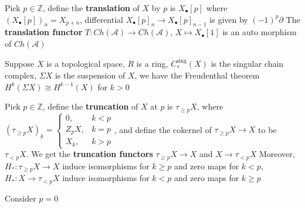 \documentclass[../main.tex]{subfiles}
\begin{document}
\begin{definition}
Pick $p\in\mathbb Z$, define the \textbf{translation} of $X$ by $p$ is $X_\bullet[p]$ where $(X_\bullet[p])_n=X_{p+n}$, differential $X_\bullet[p]_n\to X_\bullet[p]_{n-1}$ is given by $(-1)^p\partial$
The \textbf{translation functor} $T:Ch(\mathscr A)\to Ch(\mathscr A)$, $X\mapsto X_\bullet[1]$ is an auto morphism of $Ch(\mathscr A)$
\end{definition}

\begin{example}
Suppose $X$ is a topological space, $R$ is a ring, $C^{\mathrm{sing}}_*(X)$ is the singular chain complex, $\Sigma X$ is the suspension of $X$, we have the Freudenthal theorem $H^k(\Sigma X)\cong H^{k-1}(X)$ for $k>0$
\end{example}

\begin{definition}
Pick $p\in\mathbb Z$, define the \textbf{truncation} of $X$ at $p$ is $\tau_{\geq p} X$, where $(\tau_{\geq p} X)_k=\begin{cases}
0, &k<p \\
Z_pX, &k=p \\
X_k, &k>p
\end{cases}$, and define the cokernel of $\tau_{\geq p}X\to X$ to be $\tau_{<p}X$. We get the \textbf{truncation functors} $\tau_{\geq p}X\to X$ and $X\to\tau_{<p}X$
Moreover, $H_*:\tau_{\geq p}X\to X$ induce isomorphisms for $k\geq p$ and zero maps for $k<p$, $H_*:X\to\tau_{<p}X$ induce isomorphisms for $k< p$ and zero maps for $k\geq p$
\end{definition}

\begin{example}
Consider $p=0$
\begin{center}
\end{center}
\end{example}
\end{document}
